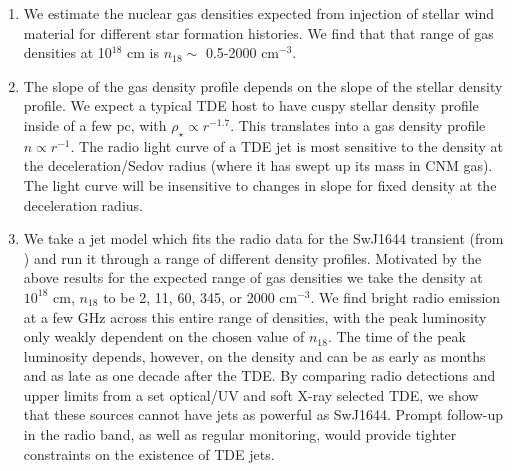 \documentclass[usenatbib,fleqn]{mnras}
\begin{document}
\begin{enumerate}
\item We estimate the nuclear gas densities expected from injection of
  stellar wind material for different star formation histories. We
  find that that range of gas densities at 10$^{18}$ cm is $n_{18}
  \sim$ 0.5-2000 cm$^{-3}$.

\item The slope of the gas density profile depends on the slope of the
  stellar density profile. We expect a typical TDE host to have cuspy
  stellar density profile inside of a few pc, with $\rho_\star
  \propto r^{-1.7}$. This translates into a gas density profile $n
  \propto r^{-1}$. The radio light curve of a TDE jet is most
  sensitive to the density at the deceleration/Sedov radius (where it
  has swept up its mass in CNM gas). The light curve will be
  insensitive to changes in slope for fixed density at the
  deceleration radius.

\item We take a jet model which fits the radio data for the SwJ1644
  transient (from \citealt{Mimica+2015}) and run it through a range of
  different density profiles. Motivated by the above results for the
  expected range of gas densities we take the density at $10^{18}$ cm,
  $n_{18}$ to be 2, 11, 60, 345, or 2000 cm$^{-3}$. We find bright
  radio emission at a few GHz across this entire range of densities,
  with the peak luminosity only weakly dependent on the chosen value
  of $n_{18}$. The time of the peak luminosity depends, however, on
  the density and can be as early as months and as late as one decade
  after the TDE. By comparing radio detections and upper limits from a
  set optical/UV and soft X-ray selected TDE, we show that these
  sources cannot have jets as powerful as SwJ1644. Prompt follow-up in
  the radio band, as well as regular monitoring, would provide tighter
  constraints on the existence of TDE jets.
\end{enumerate}

\appendix
\end{document}
